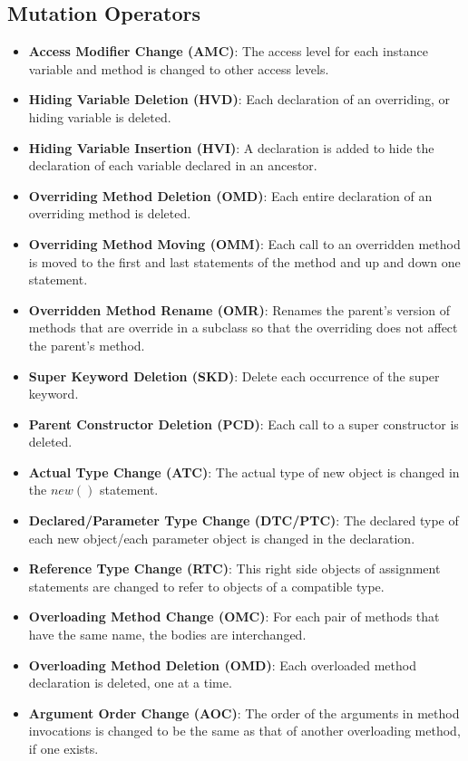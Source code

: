 \documentclass[a4paper]{article}
\begin{document}
\subsection{Mutation Operators}
\begin{itemize}
    \item \textbf{Access Modifier Change (AMC)}: The access level for each instance variable and method is changed to other access levels.
    \item \textbf{Hiding Variable Deletion (HVD)}: Each declaration of an overriding, or hiding variable is deleted.
    \item \textbf{Hiding Variable Insertion (HVI)}: A declaration is added to hide the declaration of each variable declared in an ancestor.
    \item \textbf{Overriding Method Deletion (OMD)}: Each entire declaration of an overriding method is deleted.
    \item \textbf{Overriding Method Moving (OMM)}: Each call to an overridden method is moved to the first and last statements of the method and up and down one statement.
    \item \textbf{Overridden Method Rename (OMR)}: Renames the parent’s version of methods that are override in a subclass so that the overriding does not affect the parent's method.
    \item \textbf{Super Keyword Deletion (SKD)}: Delete each occurrence of the super keyword.
    \item \textbf{Parent Constructor Deletion (PCD)}: Each call to a super constructor is deleted.
    \item \textbf{Actual Type Change (ATC)}: The actual type of new object is changed in the $new()$ statement.
    \item \textbf{Declared/Parameter Type Change (DTC/PTC)}: The declared type of each new object/each parameter object is changed in the declaration.
    \item \textbf{Reference Type Change (RTC)}:  This right side objects of assignment statements are changed to refer to objects of a compatible type.
    \item \textbf{Overloading Method Change (OMC)}: For each pair of methods that have the same name, the bodies are interchanged.
    \item \textbf{Overloading Method Deletion (OMD)}: Each overloaded method declaration is deleted, one at a time.
    \item \textbf{Argument Order Change (AOC)}: The order of the arguments in method invocations is changed to be the same as that of another overloading method, if one exists.

\end{itemize}
\end{document}

